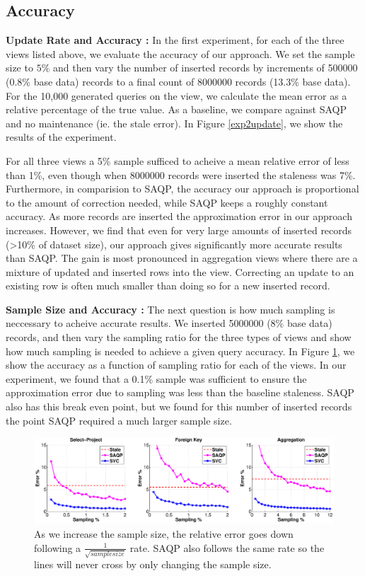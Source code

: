 \subsection{Accuracy}

{\noindent \bf Update Rate and Accuracy :}
In the first experiment, for each of the three views listed above, we evaluate the accuracy of our approach.
We set the sample size to $5\%$ and then vary the number of inserted records by increments of 500000 (0.8\% base data) records to a final count of 8000000 records (13.3\% base data).
For the 10,000 generated queries on the view, we calculate the mean error as a relative percentage of the true value.
As a baseline, we compare against SAQP and no maintenance (ie. the stale error).
In Figure \ref{exp2update}, we show the results of the experiment. 

For all three views a 5\% sample sufficed to acheive a mean relative error of less than 1\%, even though when 8000000 records were inserted the staleness was 7\%.
Furthermore, in comparision to SAQP, the accuracy our approach is proportional to the amount of correction needed, while SAQP keeps a roughly constant accuracy.
As more records are inserted the approximation error in our approach increases.
However, we find that even for very large amounts of inserted records (>10\% of dataset size), our approach gives significantly more accurate results
than SAQP.
The gain is most pronounced in aggregation views where there are a mixture of updated and inserted rows into the view.
Correcting an update to an existing row is often much smaller than doing so for a new inserted record.

{\noindent \bf Sample Size and Accuracy :} The next question is how much sampling is neccessary to acheive accurate results.
We inserted 5000000 (8\% base data) records, and then vary the sampling ratio for the three types of views and show how much sampling is needed to achieve a given query accuracy.
In Figure \ref{exp1sample}, we show the accuracy as a function of sampling ratio for each of the views.
In our experiment, we found that a 0.1\% sample was sufficient to ensure the approximation error due to sampling was less than the baseline staleness.
SAQP also has this break even point, but we found for this number of inserted records the point SAQP required a much larger sample size.

\begin{figure}[ht!]
\hspace{-4em}
 \includegraphics[scale=0.22]{exp/exp1-samplesize-accuracy.eps}
 \caption{As we increase the sample size, the relative error goes down following a $\frac{1}{\sqrt{samplesize}}$ rate. SAQP also follows the same rate so the lines will never cross by only changing the sample size. \label{exp1sample} }
\end{figure}

